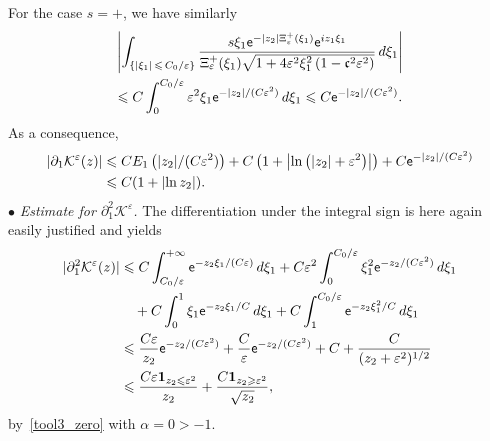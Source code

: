 \documentclass[AHL,Unicode,longabstracts,published]{cedram}
\newcommand*\p{\partial}
\newcommand*\BK{\mathcal{K}}
\newcommand{\bfun}{\mathbf{1}}
\newcommand*\ex{{\sf e}}
\newcommand*\cs{{\mathfrak c}}
\newcommand*\ii{\infty}
\newcommand*\gs{\geqslant }
\newcommand*\ls{\leqslant }
\newcommand*\e{\varepsilon}
\begin{document}
For the case $ s= + $, we have similarly
\begin{multline*}
\left\lvert  \int_{\left\{\lvert \xi_1 \rvert \,\ls\,C_0 /\e \right\}}
\frac{ s \xi_1 \ex^{- |z_2| \Xi_\e^+ (\xi_1)} \ex^{i z_1 \xi_1} }{\Xi_\e^+ (\xi_1)
\sqrt{1 + 4\e^2 \xi_1^2 \left(1 - \cs^2 \e^2\right)}} \, d\xi_1 \right\rvert
\\
\ls C \int_{0}^{C_0/ \e} \e^{2} \xi_1 \ex^{- |z_2| /(C\e^{2}) } \, d \xi_1
\ls C \ex^{- |z_2| /(C\e^{2})}.
\end{multline*}
As a consequence,
\begin{align*}
\left\lvert \p_1 \BK^\e (z) \right\rvert & \ls C E_1 \left(|z_2|/ (C\e^2)\right) + C \left(1 + \left\lvert \ln \left(|z_2| +\e^2\right) \right\rvert\right) + C \ex^{- |z_2| /(C\e^{2}) }
\\ &
\ls C (1 + \lvert \ln z_2 \rvert).
\end{align*}
$ \bullet $ \emph{Estimate for $ \p_1^2 \BK^\e $.} The differentiation under the integral sign is here again easily justified and yields
\begin{align}\label{K11_zero}
\lvert \p_1^2 \BK^\e (z) \rvert &
\ls C \int_{ C_0/ \e }^{+\ii} \ex^{- z_2 \xi_1/ (C \e)} \, d\xi_1 + C \e^2 \int_0^{ C_0/ \e } \xi_1^2 \ex^{- z_2 / (C \e^2) } \, d\xi_1
\nonumber \\ & \quad + C \int_0^{1} \xi_1 \ex^{- z_2 \xi_1 / C } \, d\xi_1 + C \int_1^{ C_0/ \e } \ex^{- z_2 \xi_1^2 / C } \, d\xi_1
\\ &
\ls \frac{C \e}{z_2} \ex^{- z_2 / (C \e^2) } + \frac{C }{\e} \ex^{- z_2 / (C \e^2) } + C + \frac{C}{ (z_2 + \e^2)^{1/2}}
\nonumber \\ &
\nonumber \ls
\frac{C \e \bfun_{z_2 \ls \e^2 }}{ z_2 } + \frac{C \bfun_{z_2 \gs \e^2 }}{ \sqrt{z_2} },
\end{align}
by~\eqref{tool3_zero} with $ \alpha = 0 > - 1 $.
\vspace*{4pt}
\end{document}
